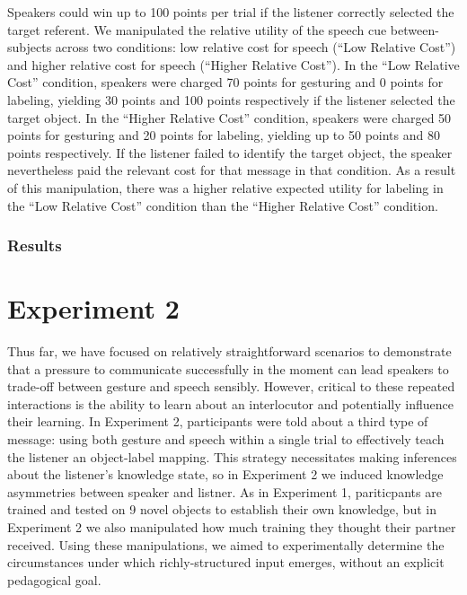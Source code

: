\documentclass[english,,man,floatsintext]{apa6}
\begin{document}
Speakers could win up to 100 points per trial if the listener correctly selected the target referent. We manipulated the relative utility of the speech cue between-subjects across two conditions: low relative cost for speech (\enquote{Low Relative Cost}) and higher relative cost for speech (\enquote{Higher Relative Cost}). In the \enquote{Low Relative Cost} condition, speakers were charged 70 points for gesturing and 0 points for labeling, yielding 30 points and 100 points respectively if the listener selected the target object. In the \enquote{Higher Relative Cost} condition, speakers were charged 50 points for gesturing and 20 points for labeling, yielding up to 50 points and 80 points respectively. If the listener failed to identify the target object, the speaker nevertheless paid the relevant cost for that message in that condition. As a result of this manipulation, there was a higher relative expected utility for labeling in the \enquote{Low Relative Cost} condition than the \enquote{Higher Relative Cost} condition.

\hypertarget{results-1}{%
\subsubsection{Results}\label{results-1}}

\hypertarget{experiment-2}{%
\section{Experiment 2}\label{experiment-2}}

Thus far, we have focused on relatively straightforward scenarios to demonstrate that a pressure to communicate successfully in the moment can lead speakers to trade-off between gesture and speech sensibly. However, critical to these repeated interactions is the ability to learn about an interlocutor and potentially influence their learning. In Experiment 2, participants were told about a third type of message: using both gesture and speech within a single trial to effectively teach the listener an object-label mapping. This strategy necessitates making inferences about the listener's knowledge state, so in Experiment 2 we induced knowledge asymmetries between speaker and listner. As in Experiment 1, pariticpants are trained and tested on 9 novel objects to establish their own knowledge, but in Experiment 2 we also manipulated how much training they thought their partner received. Using these manipulations, we aimed to experimentally determine the circumstances under which richly-structured input emerges, without an explicit pedagogical goal.
\end{document}
